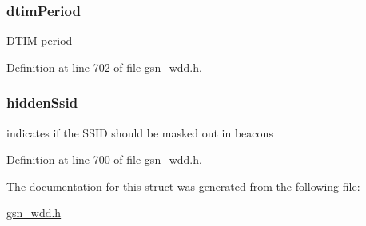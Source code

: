 \hypertarget{a00271_a299cd846e383cf8f77d0c2e71083caba}{
\subsubsection[{dtimPeriod}]{ {\bf dtimPeriod}}}
\label{a00271_a299cd846e383cf8f77d0c2e71083caba}
DTIM period 

Definition at line 702 of file gsn\_\-wdd.h.

\hypertarget{a00271_a382a496c170fb8bfac376161ed8d00e6}{
\subsubsection[{hiddenSsid}]{ {\bf hiddenSsid}}}
\label{a00271_a382a496c170fb8bfac376161ed8d00e6}
indicates if the SSID should be masked out in beacons 

Definition at line 700 of file gsn\_\-wdd.h.



The documentation for this struct was generated from the following file:\begin{DoxyCompactItemize}
\item 
\hyperlink{a00603}{gsn\_\-wdd.h}\end{DoxyCompactItemize}
